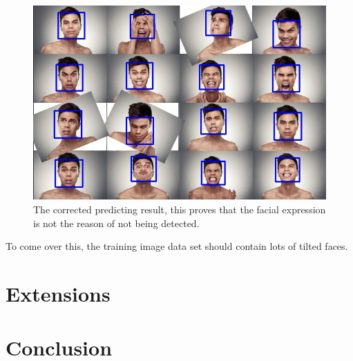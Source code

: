 \documentclass[10pt,twocolumn,letterpaper]{article}
\begin{document}
\begin{figure}[t]
    \begin{center}
        \includegraphics[width=0.9\linewidth]{facial1_corrected}
    \end{center}
    \caption{The corrected predicting result, this proves that the facial expression is not the reason of not being detected.}
    \label{fig:tiltcor}
\end{figure}

To come over this, the training image data set should contain lots of tilted faces.

\section{Extensions}

%

\section{Conclusion}
\end{document}
